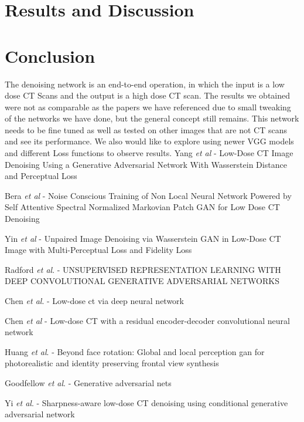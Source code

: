 \documentclass[journal]{IEEEtran}
\begin{document}
\section{Results and Discussion}
\label{results and discussion}

\section{Conclusion}
\label{conclusion}
The denoising network is an end-to-end operation, in which the input is a low dose CT Scans and the output is a high dose CT scan.  The results we obtained were not as comparable as the papers we have referenced due to small tweaking of the networks we have done, but the general concept still remains.  This network needs to be fine tuned as well as tested on other images that are not CT scans and see its performance.  We also would like to explore using newer VGG models and different Loss functions to observe results.  
\cleardoublepage
\cite{8340157} Yang \emph{et al} - Low-Dose CT Image Denoising Using a Generative Adversarial Network With Wasserstein Distance and Perceptual Loss

\cite{9474492} Bera \emph{et al} - Noise Conscious Training of Non Local Neural Network Powered by Self Attentive Spectral Normalized Markovian Patch GAN for Low Dose CT Denoising

\cite{yin2021unpaired} Yin \emph{et al} - Unpaired Image Denoising via Wasserstein GAN in Low-Dose CT Image with Multi-Perceptual Loss and Fidelity Loss

\cite{radford2015unsupervised} Radford \emph{et al}. - UNSUPERVISED REPRESENTATION LEARNING WITH DEEP CONVOLUTIONAL GENERATIVE ADVERSARIAL NETWORKS

\cite{chen2017low} Chen \emph{et al}. - Low-dose ct via deep neural network

\cite{chen2017low2} Chen \emph{et al} - Low-dose CT with a residual encoder-decoder convolutional neural network

\cite{huang2017beyond} Huang \emph{et al}. - Beyond face rotation: Global and local perception gan for photorealistic and identity preserving frontal view synthesis

\cite{goodfellow2014generative} Goodfellow \emph{et al}. - Generative adversarial nets

\cite{yi2018sharpness} Yi \emph{et al}. - Sharpness-aware low-dose CT denoising using conditional generative adversarial network





\end{document}
